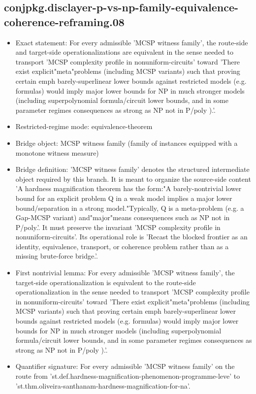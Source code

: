 \documentclass[11pt]{article}
\begin{document}
\subsection*{conjpkg.disclayer-p-vs-np-family-equivalence-coherence-reframing.08}
\begin{itemize}
\item Exact statement: For every admissible 'MCSP witness family', the route-side and target-side operationalizations are equivalent in the sense needed to transport 'MCSP complexity profile in nonuniform-circuits' toward 'There exist explicit"meta"problems (including MCSP variants) such that proving certain emph barely-superlinear lower bounds against restricted models (e.g. formulas) would imply major lower bounds for NP in much stronger models (including superpolynomial formula/circuit lower bounds, and in some parameter regimes consequences as strong as NP not in P/poly ).'.
\item Restricted-regime mode: equivalence-theorem
\item Bridge object: MCSP witness family (family of instances equipped with a monotone witness measure)
\item Bridge definition: 'MCSP witness family' denotes the structured intermediate object required by this branch. It is meant to organize the source-side content 'A hardness magnification theorem has the form:"A barely-nontrivial lower bound for an explicit problem Q in a weak model implies a major lower bound/separation in a strong model."Typically, Q is a meta-problem (e.g. a Gap-MCSP variant) and"major"means consequences such as NP not in P/poly.'. It must preserve the invariant 'MCSP complexity profile in nonuniform-circuits'. Its operational role is 'Recast the blocked frontier as an identity, equivalence, transport, or coherence problem rather than as a missing brute-force bridge.'.
\item First nontrivial lemma: For every admissible 'MCSP witness family', the target-side operationalization is equivalent to the route-side operationalization in the sense needed to transport 'MCSP complexity profile in nonuniform-circuits' toward 'There exist explicit"meta"problems (including MCSP variants) such that proving certain emph barely-superlinear lower bounds against restricted models (e.g. formulas) would imply major lower bounds for NP in much stronger models (including superpolynomial formula/circuit lower bounds, and in some parameter regimes consequences as strong as NP not in P/poly ).'.
\item Quantifier signature: For every admissible 'MCSP witness family' on the route from 'st.def.hardness-magnification-phenomenon-programme-leve' to 'st.thm.oliveira-santhanam-hardness-magnification-for-na'.

\end{itemize}
\end{document}
